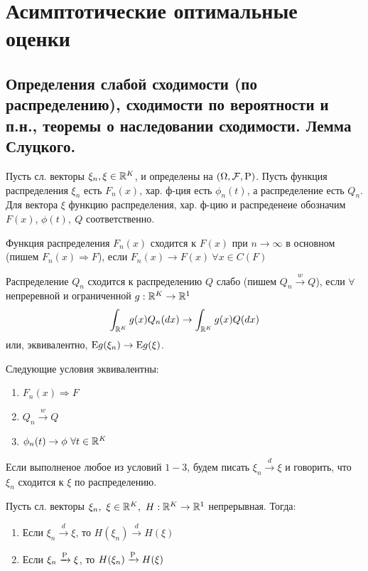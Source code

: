 \section{Асимптотические оптимальные оценки}

\subsection{Определения слабой сходимости (по распределению), сходимости по вероятности и п.н.,
теоремы о наследовании сходимости. Лемма Слуцкого.}
    Пусть сл. векторы \(\xi_n, \xi \in \R^K\), и определены на \((\Omega, \mathcal{F}, \P)\).
Пусть функция распределения \(\xi_n\) есть \(F_n(x)\), хар. ф-ция есть \(\phi_n(t)\), а распределение
есть \(Q_n\). Для вектора \(\xi\) функцию распределения, хар. ф-цию и распреденеие обозначим \(F(x)\),
\(\phi(t),\ Q\) соответственно.

\begin{definition}
    Функция распределения \(F_n(x)\) сходится к \(F(x)\) при \(n \rightarrow \infty\) в основном
    (пишем \(F_n(x) \Rightarrow F\)), если \(F_n(x) \rightarrow F(x) \ \forall x \in C(F)\)
\end{definition}
\begin{definition}
    Распределение \(Q_n\) сходится к распределению \(Q\) слабо (пишем \(Q_n \xrightarrow{w} Q\)),
    если \(\forall\) непреревной и ограниченной \(g: \R^K \rightarrow \R^1\)
    \[ \int_{\R^K} g(x)Q_n(dx) \rightarrow \int_{\R^K} g(x)Q(dx)\]
    или, эквивалентно, \(\E g(\xi_n) \rightarrow \E g(\xi)\).
\end{definition}
\begin{theorem}
    Следующие условия эквивалентны:
    \begin{enumerate}
        \item \(F_n(x) \Rightarrow F\)
        \item \(Q_n \xrightarrow{w} Q\)
        \item \(\phi_n(t) \rightarrow \phi \ \forall t \in \R^K\)
    \end{enumerate}
    Если выполненое любое из условий \(1 - 3\), будем писать
    \(\xi_n \xrightarrow{d} \xi\) и говорить, что \(\xi_n\) сходится к \(\xi\) по распределению.
\end{theorem}
\begin{theorem} \label{th::inherit_conv}
    Пусть сл. векторы \(\xi_n,\ \xi\in\R^K,\ H:\R^K\rightarrow\R^1\) непрерывная.
    Тогда:
    \begin{enumerate}
        \item Если \(\xi_n \xrightarrow{d} \xi\), то \(H(\xi_n) \xrightarrow{d} H(\xi)\)
        \item Если \(\xi_n \xrightarrow{\P} \xi\), то \(H(\xi_n) \xrightarrow{\P} H(\xi)\)
    \end{enumerate}
\end{theorem}

